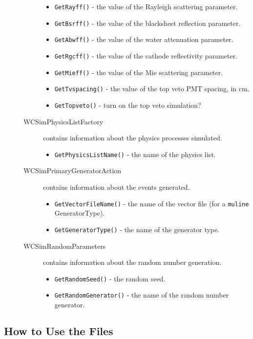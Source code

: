 \begin{description}
\begin{description}
    \begin{itemize}
    \item \texttt{GetRayff()} - the value of the Rayleigh scattering parameter.
    \item \texttt{GetBsrff()} - the value of the blacksheet reflection parameter.
    \item \texttt{GetAbwff()} - the value of the water attenuation parameter.
    \item \texttt{GetRgcff()} - the value of the cathode reflectivity parameter.
    \item \texttt{GetMieff()} - the value of the Mie scattering parameter.
    \item \texttt{GetTvspacing()} - the value of the top veto PMT spacing, in cm.
    \item \texttt{GetTopveto()} - turn on the top veto simulation?
    \end{itemize}
  \item[WCSimPhysicsListFactory] contains information about the physics processes simulated.
    \begin{itemize}
    \item \texttt{GetPhysicsListName()} - the name of the physics list.
    \end{itemize}
  \item[WCSimPrimaryGeneratorAction] contains information about the events generated.
    \begin{itemize}
    \item \texttt{GetVectorFileName()} - the name of the vector file (for a \texttt{muline} GeneratorType).
    \item \texttt{GetGeneratorType()} - the name of the generator type.
    \end{itemize}
  \item[WCSimRandomParameters] contains information about the random number generation.
    \begin{itemize}
    \item \texttt{GetRandomSeed()} - the random seed.
    \item \texttt{GetRandomGenerator()} - the name of the random number generator.
    \end{itemize}
  \end{description}
\end{description}


\subsection{How to Use the Files}

